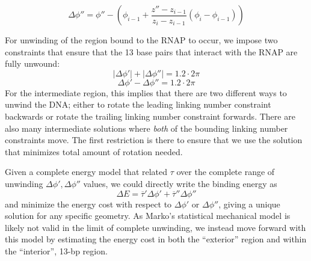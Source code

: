 \documentclass[11pt]{article}
\begin{document}
\begin{equation}
    \Delta \phi'' = \phi'' - \left(\phi_{i - 1} + \frac{z'' - z_{i-1}}{z_i - z_{i-1}} (\phi_i - \phi_{i-1})\right)
\end{equation}

For unwinding of the region bound to the RNAP to occur, we impose two constraints that ensure that the 13 base pairs that interact with the RNAP are fully unwound:
\begin{equation}
    |\Delta \phi'| + |\Delta \phi''| = 1.2 \cdot 2 \pi
\end{equation}
\begin{equation}
    \Delta \phi' - \Delta \phi'' = 1.2 \cdot 2\pi \label{eq:dphi_relation}
\end{equation}
For the intermediate region, this implies that there are two different ways to unwind the DNA; either to rotate the leading linking number constraint backwards or rotate the trailing linking number constraint forwards. There are also many intermediate solutions where \emph{both} of the bounding linking number constraints move. The first restriction is there to ensure that we use the solution that minimizes total amount of rotation needed.

Given a complete energy model that related \(\tau\) over the complete range of unwinding \(\Delta \phi', \Delta \phi''\) values, we could directly write the binding energy as
\begin{equation}
    \Delta E = \overline \tau' \Delta \phi' + \overline \tau'' \Delta \phi''
    \label{eq:direct_torque_calc}
\end{equation}
and minimize the energy cost with respect to \(\Delta \phi'\) or \(\Delta \phi''\), giving a unique solution for any specific geometry. As Marko's statistical mechanical model is likely not valid in the limit of complete unwinding, we instead move forward with this model by estimating the energy cost in both the ``exterior'' region and within the ``interior'', 13-bp region.
\end{document}
